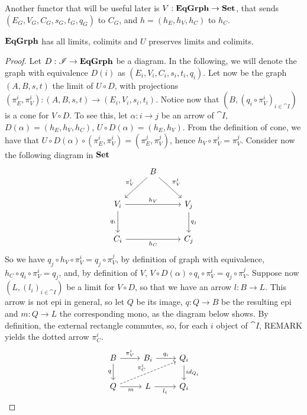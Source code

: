 Another functor that will be useful later is $V: \mathbf{EqGrph} \to \mathbf{Set}$, that sends $(E_G, V_G, C_G, s_G, t_G, q_G)$ to $C_G$, and $h = (h_E, h_V, h_C)$ to $h_C$.

\begin{prop}
    $\mathbf{EqGrph}$ has all limits, colimits and $U$ preserves limits and colimits.
\end{prop}

\begin{proof}
    Let $D : \mathscr{I} \to \mathbf{EqGrph}$ be a diagram. In the following, we will denote the graph with equivalence $D(i)$ as $(E_i, V_i, C_i, s_i, t_i, q_i)$.
    Let now be the graph $(A, B, s, t)$ the limit of $U \circ D$, with projections $(\pi_E^i, \pi_V^i):(A, B, s, t) \to (E_i, V_i, s_i, t_i)$. Notice now that $(B, (q_i\circ \pi_V^i)_{i \in \cat I})$ is a cone for $V \circ D$. To see this, let $\alpha : i \to j$ be an arrow of $\cat I$, $D(\alpha) = (h_E, h_V, h_C)$, $U \circ D (\alpha) = (h_E, h_V)$. From the definition of cone, we have that $U \circ D (\alpha) \circ (\pi_E^i, \pi_V^i) = (\pi_E^j, \pi_V^j)$, hence $h_V \circ \pi_V^i = \pi_V^j$. 
    Consider now the following diagram in $\mathbf{Set}$
    \[
        \begin{tikzcd}[row sep=25 pt, column sep = 25 pt]
            & B \arrow[dl, "{\pi_V^i}"swap] \arrow[dr, "{\pi_V^j}"] & \\
            V_i \arrow[rr, "{h_V}"] \arrow[d, "{q_i}" swap] & & V_j \arrow[d, "{q_j}"] \\
            C_i \arrow[rr, "{h_C}" swap] & & C_j 
        \end{tikzcd}
    \]
    So we have $q_j \circ h_V \circ \pi_V^i = q_j \circ \pi_V^j$, by definition of graph with equivalence, $h_C \circ q_i \circ \pi_V^i = q_j$, and, by definition of $V$, $V \circ D (\alpha) \circ q_i \circ \pi_V^i = q_j \circ \pi_V^j$.
    Suppose now $(L, (l_i)_{i \in \cat I})$ be a limit for $V \circ D$, so that we have an arrow $l: B \to L$. This arrow is not epi in general, so let $Q$ be its image, $q: Q \to B$ be the resulting epi and $m: Q \to L$ the corresponding mono, as the diagram below shows. By definition, the external rectangle commutes, so, for each $i$ object of $\cat I$, 
    REMARK
    yields the dotted arrow $\pi_C^i$.
    \[
        \begin{tikzcd}
            B \arrow[r, "{\pi_V^i}"] \arrow[d, "q" swap] & B_i \arrow[r, "{q_i}"] & Q_i \arrow[d, "{id_{Q_i}}"] \\
            Q \arrow[urr, dashed, "\pi_C^i"] \arrow[r, "m" swap] &L \arrow[r, "{l_i}"swap] & Q_i

\end{tikzcd}\]
\end{proof}
